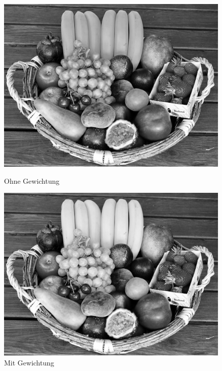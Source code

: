 \documentclass[course=erap]{aspdoc}
\begin{document}
	\begin{figure}[h]
		\begin{minipage}{0.49\linewidth}
			\centering
			\includegraphics[scale=0.3]{Images/fruit_basket_grey_standard.png}
			\caption{Ohne Gewichtung}
		\end{minipage}
		\centering
		\begin{minipage}{0.49\linewidth}
			\centering
			\includegraphics[scale=0.3]{Images/fruit_basket_grey_improved.png}
			\caption{Mit Gewichtung}
		\end{minipage}
	\end{figure}\\
	
\end{document}
